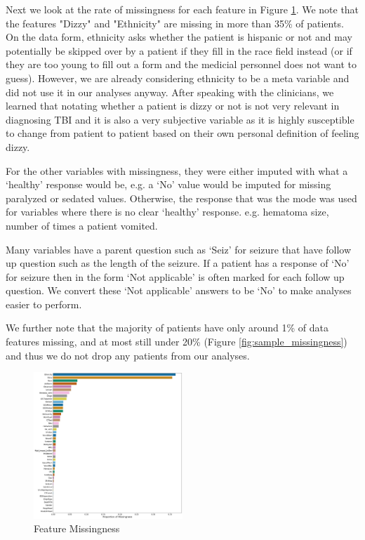\documentclass[11pt]{amsart}
\begin{document}
Next we look at the rate of missingness for each feature in Figure \ref{fig:cov_missing}. We note that the features "Dizzy" and "Ethnicity" are missing in more than 35\% of patients. On the data form, ethnicity asks whether the patient is hispanic or not and may potentially be skipped over by a patient if they fill in the race field instead (or if they are too young to fill out a form and the medicial personnel does not want to guess). However, we are already considering ethnicity to be a meta variable and did not use it in our analyses anyway. After speaking with the clinicians, we learned that notating whether a patient is dizzy or not is not very relevant in diagnosing TBI and it is also a very subjective variable as it is highly susceptible to change from patient to patient based on their own personal definition of feeling dizzy. 

For the other variables with missingness, they were either imputed with what a `healthy' response would be, e.g. a `No' value would be imputed for missing paralyzed or sedated values. Otherwise, the response that was the mode was used for variables where there is no clear `healthy' response. e.g. hematoma size, number of times a patient vomited.

Many variables have a parent question such as `Seiz' for seizure that have follow up question such as the length of the seizure. If a patient has a response of `No' for seizure then in the form `Not applicable' is often marked for each follow up question. We convert these `Not applicable' answers to be `No' to make analyses easier to perform.

We further note that the majority of patients have only around 1\% of data features missing, and at most still under 20\% (Figure \ref{fig:sample_missingness}) and thus we do not drop any patients from our analyses.
\FloatBarrier
\begin{figure}
	\centering
	\includegraphics[width=0.5\textwidth]{covariate_missingness.png}
	\caption{Feature Missingness}\label{fig:cov_missing}
\end{figure}
\end{document}
